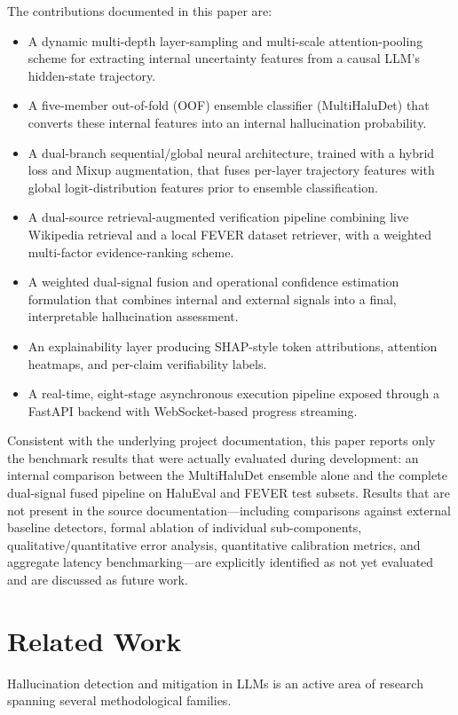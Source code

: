 \documentclass[conference]{IEEEtran}
\begin{document}
The contributions documented in this paper are:
\begin{itemize}
    \item A dynamic multi-depth layer-sampling and multi-scale attention-pooling scheme for extracting internal uncertainty features from a causal LLM’s hidden-state trajectory.
    \item A five-member out-of-fold (OOF) ensemble classifier (MultiHaluDet) that converts these internal features into an internal hallucination probability.
    \item A dual-branch sequential/global neural architecture, trained with a hybrid loss and Mixup augmentation, that fuses per-layer trajectory features with global logit-distribution features prior to ensemble classification.
    \item A dual-source retrieval-augmented verification pipeline combining live Wikipedia retrieval and a local FEVER dataset retriever, with a weighted multi-factor evidence-ranking scheme.
    \item A weighted dual-signal fusion and operational confidence estimation formulation that combines internal and external signals into a final, interpretable hallucination assessment.
    \item An explainability layer producing SHAP-style token attributions, attention heatmaps, and per-claim verifiability labels.
    \item A real-time, eight-stage asynchronous execution pipeline exposed through a FastAPI backend with WebSocket-based progress streaming.
\end{itemize}

Consistent with the underlying project documentation, this paper reports only the benchmark results that were actually evaluated during development: an internal comparison between the MultiHaluDet ensemble alone and the complete dual-signal fused pipeline on HaluEval and FEVER test subsets. Results that are not present in the source documentation---including comparisons against external baseline detectors, formal ablation of individual sub-components, qualitative/quantitative error analysis, quantitative calibration metrics, and aggregate latency benchmarking---are explicitly identified as not yet evaluated and are discussed as future work.

\section{Related Work}
Hallucination detection and mitigation in LLMs is an active area of research spanning several methodological families.
\end{document}

